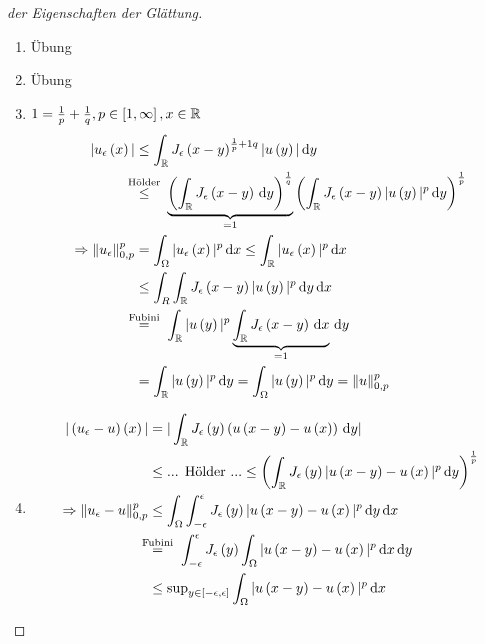 \begin{proof}[der Eigenschaften der Glättung]
	\begin{enumerate}
		\item Übung
		\item Übung
		\item $1=\frac{1}{p} + \frac{1}{q}, p\in\left[1,\infty\right], x\in\mathbb{R}$
			\begin{align*}
				|u_{\e}\left(x\right)| &\leq \int_{\R}J_{\e}\left(x-y\right)^{\frac{1}{p}+{1}{q}}|u\left(y\right)|\,\mathrm{d}y\\
					&\overset{\mathclap{\text{Hölder}}}{\leq} \hspace*{1em} \underbrace{\left(\int_{\R}J_{\e}\left(x-y\right)\,\mathrm{d}y\right)^{\frac{1}{q}}}_{=1} \left(\int_{\R}J_{\e}\left(x-y\right)|u\left(y\right)|^{p}\,\mathrm{d}y\right)^{\frac{1}{p}}\\
				\implies\|u_{\e}\|^{p}_{0,p} &= \int_{\W}|u_{\e}\left(x\right)|^{p}\,\mathrm{d}x \leq \int_{\R}|u_{\e}\left(x\right)|^{p}\,\mathrm{d}x\\
					&\leq \int_{R}\int_{\R}J_{\e}\left(x-y\right)|u\left(y\right)|^{p}\,\mathrm{d}y\,\mathrm{d}x\\
					&\overset{\mathclap{\text{Fubini}}}{=}\hspace*{1em}\int_{\R}|u\left(y\right)|^{p}\underbrace{\int_{\R}J_{\e}\left(x-y\right)\,\mathrm{d}x}_{=1}\,\mathrm{d}y\\
					&=\int_{\R}|u\left(y\right)|^{p}\,\mathrm{d}y = \int_{\W}|u\left(y\right)|^{p}\,\mathrm{d}y = \|u\|^{p}_{0,p}
			\end{align*}
		\item{}
			\begin{align*}
				|\left(u_{\e}-u\right)\left(x\right)| &= |\int_{\R}J_{\e}\left(y\right)\left(u\left(x-y\right)-u\left(x\right)\right)\,\mathrm{d}y|\\
					&\leq \text{... Hölder ...} \leq \left(\int_{\R}J_{\e}\left(y\right)|u\left(x-y\right)-u\left(x\right)|^{p}\,\mathrm{d}y\right)^{\frac{1}{p}}\\
				\implies \|u_{\e}-u\|_{0,p}^{p} &\leq \int_{\W}\int_{-\e}^{\e}J_{\e}\left(y\right)|u\left(x-y\right)-u\left(x\right)|^{p}\,\mathrm{d}y\,\mathrm{d}x\\
					&\overset{\mathclap{\text{Fubini}}}{=}\hspace*{1em} \int_{-\e}^{\e}J_{\e}\left(y\right)\int_{\W}|u\left(x-y\right)-u\left(x\right)|^{p}\,\mathrm{d}x\,\mathrm{d}y\\
					&\leq \operatorname{sup}_{y\in\left[-\e,\e\right]}\int_{\W}|u\left(x-y\right)-u\left(x\right)|^{p}\,\mathrm{d}x

\end{align*}
\end{enumerate}
\end{proof}
